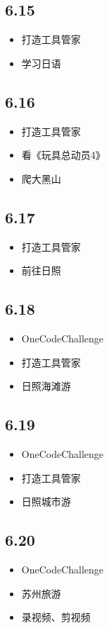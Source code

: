 \documentclass[UTF8]{ctexart}
\begin{document}
\subsection*{6.15}
\begin{itemize}
    \item 打造工具管家
    \item 学习日语
\end{itemize}

\subsection*{6.16}
\begin{itemize}
    \item 打造工具管家
    \item 看《玩具总动员4》
    \item 爬大黑山
\end{itemize}

\subsection*{6.17}
\begin{itemize}
    \item 打造工具管家
    \item 前往日照
\end{itemize}

\subsection*{6.18}
\begin{itemize}
    \item OneCodeChallenge
    \item 打造工具管家
    \item 日照海滩游
\end{itemize}

\subsection*{6.19}
\begin{itemize}
    \item OneCodeChallenge
    \item 打造工具管家
    \item 日照城市游
\end{itemize}

\subsection*{6.20}
\begin{itemize}
    \item OneCodeChallenge
    \item 苏州旅游
    \item 录视频、剪视频
\end{itemize}
\end{document}
